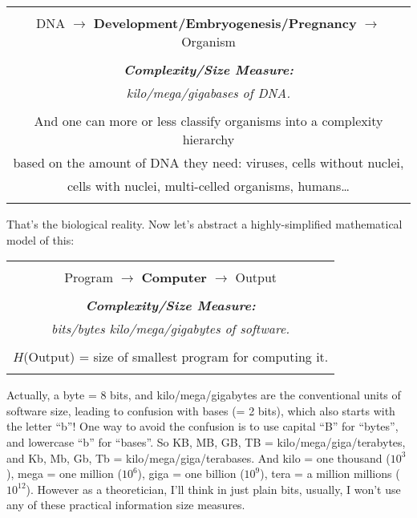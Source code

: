 \documentclass[12pt]{book}
\begin{document}
\begin{center}
\begin{tabular}{|c|}
\hline
\\
DNA $\longrightarrow$ \textbf{Development/Embryogenesis/Pregnancy} $\longrightarrow$ Organism 
\\ \\
\emph{\textbf{Complexity/Size Measure:}}
\\
\emph{kilo/mega/gigabases of DNA.}
\\ \\
And one can more or less classify organisms into a complexity hierarchy 
\\
based on the amount of DNA they need: viruses, cells without nuclei, 
\\
cells with nuclei, multi-celled organisms, humans\ldots
\\
\\
\hline
\end{tabular}
\end{center}
 
That's the biological reality. Now let's abstract a highly-simplified mathematical model of this:
 
\begin{center}
\begin{tabular}{|c|}
\hline
\\
Program $\longrightarrow$ \textbf{\large Computer} $\longrightarrow$ Output 
\\ \\
\emph{\textbf{Complexity/Size Measure:}}
\\
\emph{bits/bytes kilo/mega/gigabytes of software.}
\\ \\
$H$(Output) = size of smallest program for computing it.
\\
\\
\hline
\end{tabular}
\end{center}
 
Actually, a byte = 8 bits, and kilo/mega/gigabytes are the conventional units of software size, 
leading to confusion with bases (= 2 bits), which also starts with the letter ``b''!
One way to avoid the confusion is to use capital ``B'' for ``bytes'', and lowercase ``b'' for ``bases''.
So KB, MB, GB, TB = kilo/mega/giga/terabytes, and Kb, Mb, Gb, Tb = kilo/mega/giga/terabases.
And kilo = one thousand ($10^3$), mega = one million ($10^6$), 
giga = one billion ($10^9$), tera = a million millions ($10^{12}$).
However as a theoretician, I'll think in just plain bits, usually, I won't use any of these
practical information size measures.
 
\end{document}
